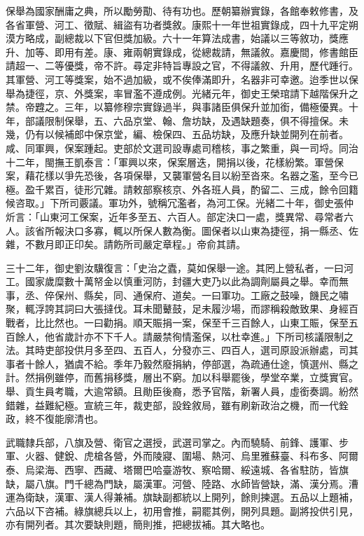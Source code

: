 \begin{pinyinscope}
保舉為國家酬庸之典，所以勵勞勩、待有功也。歷朝纂辦實錄，各館奉敕修書，及各省軍營、河工、徵賦、緝盜有功者獎敘。康熙十一年世祖實錄成，四十九平定朔漠方略成，副總裁以下官但獎加級。六十一年算法成書，始議以三等敘功，獎應升、加等、即用有差。康、雍兩朝實錄成，從總裁請，無議敘。嘉慶間，修書館臣請超一、二等優獎，帝不許。尋定非特旨專設之官，不得議敘、升用，歷代踵行。其軍營、河工等獎案，始不過加級，或不俟俸滿即升，名器非可幸邀。迨季世以保舉為捷徑，京、外獎案，率冒濫不遵成例。光緒元年，御史王榮琯請下越階保升之禁。帝韙之。三年，以纂修穆宗實錄過半，與事諸臣俱保升並加銜，備極優異。十年，部議限制保舉，五、六品京堂、翰、詹坊缺，及遇缺題奏，俱不得擅保。未幾，仍有以候補郎中保京堂，編、檢保四、五品坊缺，及應升缺並開列在前者。咸、同軍興，保案踵起。吏部於文選司設專處司稽核，事之繁重，與一司埒。同治十二年，閩撫王凱泰言：「軍興以來，保案層迭，開捐以後，花樣紛繁。軍營保案，藉花樣以爭先恐後，各項保舉，又襲軍營名目以紛至沓來。名器之濫，至今已極。盈千累百，徒形冗雜。請敕部察核京、外各班人員，酌留二、三成，餘令回籍候咨取。」下所司覈議。軍功外，號稱冗濫者，為河工保。光緒二十年，御史張仲炘言：「山東河工保案，近年多至五、六百人。部定決口一處，獎異常、尋常者六人。該省所報決口多寡，輒以所保人數為衡。圖保者以山東為捷徑，捐一縣丞、佐雜，不數月即正印矣。請飭所司嚴定章程。」帝俞其請。

三十二年，御史劉汝驥復言：「史治之蠹，莫如保舉一途。其罔上營私者，一曰河工。國家歲糜數十萬帑金以慎重河防，封疆大吏乃以此為調劑屬員之舉。幸而無事，丞、倅保州、縣矣，同、通保府、道矣。一曰軍功。工廠之鼓噪，饑民之嘯聚，輒浮誇其詞曰大張撻伐。耳未聞鼙鼓，足未履沙場，而謬稱殺敵致果、身經百戰者，比比然也。一曰勸捐。順天賑捐一案，保至千三百餘人，山東工賑，保至五百餘人，他省歲計亦不下千人。請嚴禁徇情濫保，以杜幸進。」下所司核議限制之法。其時吏部投供月多至四、五百人，分發亦三、四百人，選司原設派辦處，司其事者十餘人，猶虞不給。季年乃毅然廢捐納，停部選，為疏通仕途，慎選州、縣之計。然捐例雖停，而舊捐移獎，層出不窮。加以科舉罷後，學堂卒業，立獎實官。舉、貢生員考職，大逾常額。且勛臣後裔，悉予官階，新署人員，虛銜奏調。紛然錯雜，益難紀極。宣統三年，裁吏部，設銓敘局，雖有刷新政治之機，而一代銓政，終不復能廓清也。

武職隸兵部，八旗及營、衛官之選授，武選司掌之。內而驍騎、前鋒、護軍、步軍、火器、健銳、虎槍各營，外而陵寢、圍場、熱河、烏里雅蘇臺、科布多、阿爾泰、烏梁海、西寧、西藏、塔爾巴哈臺游牧、察哈爾、綏遠城、各省駐防，皆旗缺，屬八旗。門千總為門缺，屬漢軍。河營、陸路、水師皆營缺，滿、漢分焉。漕運為衛缺，漢軍、漢人得兼補。旗缺副都統以上開列，餘則揀選。五品以上題補，六品以下咨補。綠旗總兵以上，初用會推，嗣罷其例，開列具題。副將投供引見，亦有開列者。其次要缺則題，簡則推，把總拔補。其大略也。


\end{pinyinscope}
